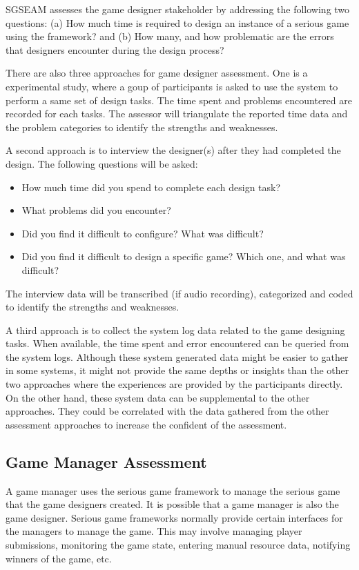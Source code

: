SGSEAM assesses the game designer stakeholder by addressing the following two questions: (a) How
much time is required to design an instance of a serious game using the framework? and (b) How
many, and how problematic are the errors that designers encounter during the design process?

There are also three approaches for game designer assessment. One is a experimental study, where a
goup of participants is asked to use the system to perform a same set of design tasks. The time
spent and problems encountered are recorded for each tasks. The assessor will triangulate the
reported time data and the problem categories to identify the strengths and weaknesses.

A second approach is to interview the designer(s) after they had completed the design.
The following questions will be asked:
\begin{itemize}
\item How much time did you spend to complete each design task?
\item What problems did you encounter?
\item Did you find it difficult to configure? What was difficult?
\item Did you find it difficult to design a specific game? Which one, and what was difficult?
\end{itemize}

The interview data will be transcribed (if audio recording), categorized and coded to identify the
strengths and weaknesses.

A third approach is to collect the system log data related to the game designing tasks. When
available, the time spent and error encountered can be queried from the system logs. Although these
system generated data might be easier to gather in some systems, it might not provide the same
depths or insights than the other two approaches where the experiences are provided by the
participants directly. On the other hand, these system data can be supplemental to the other
approaches. They could be correlated with the data gathered from the other assessment approaches
 to increase the confident of the assessment.

\subsection{Game Manager Assessment}

A game manager uses the serious game framework to manage the serious game that the game
designers created. It is possible that a game manager is also the game designer.
Serious game frameworks normally provide certain interfaces for the managers to manage the
game. This may involve managing player submissions, monitoring the game state, entering
manual resource data, notifying winners of the game, etc.

